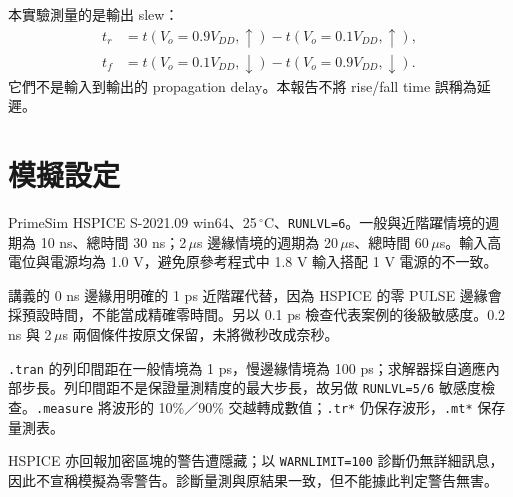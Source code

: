 本實驗測量的是輸出 slew：
\[
\begin{aligned}
t_r&=t(V_o=0.9V_{DD},\uparrow)-t(V_o=0.1V_{DD},\uparrow),\\
t_f&=t(V_o=0.1V_{DD},\downarrow)-t(V_o=0.9V_{DD},\downarrow).
\end{aligned}
\]
它們不是輸入到輸出的 propagation delay。本報告不將 rise/fall time 誤稱為延遲。

\section{模擬設定}
PrimeSim HSPICE S-2021.09 win64、25\,$^\circ$C、\texttt{RUNLVL=6}。一般與近階躍情境的週期為 10 ns、總時間 30 ns；2\,$\mu$s 邊緣情境的週期為 20\,$\mu$s、總時間 60\,$\mu$s。輸入高電位與電源均為 1.0 V，避免原參考程式中 1.8 V 輸入搭配 1 V 電源的不一致。

講義的 0 ns 邊緣用明確的 1 ps 近階躍代替，因為 HSPICE 的零 PULSE 邊緣會採預設時間，不能當成精確零時間。另以 0.1 ps 檢查代表案例的後級敏感度。0.2 ns 與 2\,$\mu$s 兩個條件按原文保留，未將微秒改成奈秒。

\texttt{.tran} 的列印間距在一般情境為 1 ps，慢邊緣情境為 100 ps；求解器採自適應內部步長。列印間距不是保證量測精度的最大步長，故另做 \texttt{RUNLVL=5/6} 敏感度檢查。\texttt{.measure} 將波形的 10\%／90\% 交越轉成數值；\texttt{.tr*} 仍保存波形，\texttt{.mt*} 保存量測表。

HSPICE 亦回報加密區塊的警告遭隱藏；以 \texttt{WARNLIMIT=100} 診斷仍無詳細訊息，因此不宣稱模擬為零警告。診斷量測與原結果一致，但不能據此判定警告無害。

